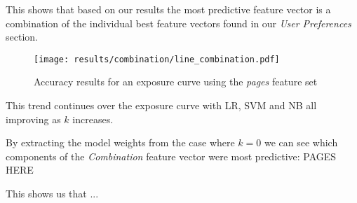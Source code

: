 This shows that based on our results the most predictive feature vector is a combination of the individual best feature vectors found 
in our \emph{User Preferences} section.

\begin{figure}[h]
	\begin{center}
		\texttt{[image: results/combination/line\_combination.pdf]}
		\caption{Accuracy results for an exposure curve using the \emph{pages} feature set}
	\end{center}
\end{figure}

This trend continues over the exposure curve with LR, SVM and NB all improving as $k$ increases.

By extracting the model weights from the case where $k=0$ we can see which components of the \emph{Combination} feature vector were most
predictive:
PAGES HERE

This shows us that ...

